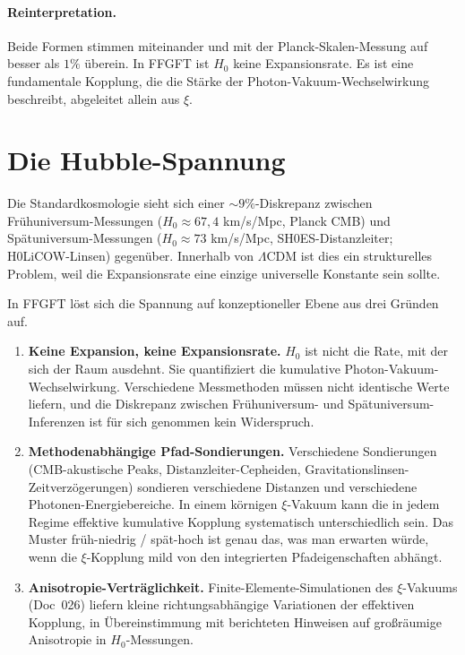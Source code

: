 \documentclass[11pt,a4paper]{article}
\begin{document}
\paragraph{Reinterpretation.} Beide Formen stimmen miteinander und mit der Planck-Skalen-Messung auf besser als $1\%$ überein. In FFGFT ist $H_0$ keine Expansionsrate. Es ist eine fundamentale Kopplung, die die Stärke der Photon-Vakuum-Wechselwirkung beschreibt, abgeleitet allein aus $\xi$.

\section{Die Hubble-Spannung}

Die Standardkosmologie sieht sich einer $\sim 9\%$-Diskrepanz zwischen Frühuniversum-Messungen ($H_0 \approx 67{,}4$ km/s/Mpc, Planck CMB) und Spätuniversum-Messungen ($H_0 \approx 73$ km/s/Mpc, SH0ES-Distanzleiter; H0LiCOW-Linsen) gegenüber. Innerhalb von $\Lambda$CDM ist dies ein strukturelles Problem, weil die Expansionsrate eine einzige universelle Konstante sein sollte.

In FFGFT löst sich die Spannung auf konzeptioneller Ebene aus drei Gründen auf.

\begin{enumerate}\itemsep2pt
\item \textbf{Keine Expansion, keine Expansionsrate.} $H_0$ ist nicht die Rate, mit der sich der Raum ausdehnt. Sie quantifiziert die kumulative Photon-Vakuum-Wechselwirkung. Verschiedene Messmethoden müssen nicht identische Werte liefern, und die Diskrepanz zwischen Frühuniversum- und Spätuniversum-Inferenzen ist für sich genommen kein Widerspruch.

\item \textbf{Methodenabhängige Pfad-Sondierungen.} Verschiedene Sondierungen (CMB-akustische Peaks, Distanzleiter-Cepheiden, Gravitationslinsen-Zeitverzögerungen) sondieren verschiedene Distanzen und verschiedene Photonen-Energiebereiche. In einem körnigen $\xi$-Vakuum kann die in jedem Regime effektive kumulative Kopplung systematisch unterschiedlich sein. Das Muster früh-niedrig / spät-hoch ist genau das, was man erwarten würde, wenn die $\xi$-Kopplung mild von den integrierten Pfadeigenschaften abhängt.

\item \textbf{Anisotropie-Verträglichkeit.} Finite-Elemente-Simulationen des $\xi$-Vakuums (Doc~026) liefern kleine richtungsabhängige Variationen der effektiven Kopplung, in Übereinstimmung mit berichteten Hinweisen auf großräumige Anisotropie in $H_0$-Messungen.
\end{enumerate}
\end{document}
